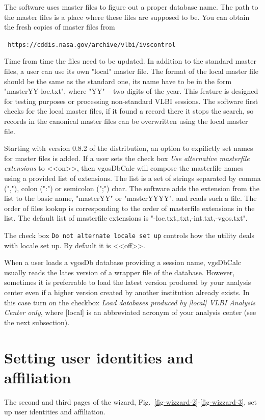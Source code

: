\documentclass [10pt,letterpaper]{report}
\begin{document}
The software uses master files to figure out a proper database name.
The path to the master files is a place where these files are
supposed to be. You can obtain the fresh copies of master files from
\begin{center}
{\tt
https://cddis.nasa.gov/archive/vlbi/ivscontrol
}
\end{center}
\noindent
Time from time the files need to be updated. In addition to the standard master
files, a user can use its own "local" master file. The format of the local master
file should be the same as the standard one, its name have to be in the form
"masterYY-loc.txt", where "YY" -- two digits of the year. This feature is designed
for testing purposes or processing non-standard VLBI sessions. The software first
checks for the local master files, if it found a record there it stops the search,
so records in the canonical master files can be overwritten using the local
master file.

Starting with version 0.8.2 of the distribution, an option to expilictly set names
for master files is added. If a user sets the check box {\sl Use alternative
masterfile extensions} to <<on>>, then vgosDbCalc will compose the masterfile names
using a provided list of extensions. The list is a set of strings separated by
comma (","), colon (":") or semicolon (";") char. The software adds the extension
from the list to the basic name, "masterYY" or "masterYYYY", and reads such a file.
The order of files lookup is corresponding to the order of masterfile
extensions in the list. The default list of masterfile extensions is
"-loc.txt,.txt,-int.txt,-vgos.txt".

The check box {\tt Do not alternate locale set up} controls how the utility
deals with locale set up. By default it is <<off>>.

When a user loads a vgosDb database providing a session name, vgsDbCalc
usually reads the lates version of a wrapper file of the database.
However, sometimes it is preferrable to load the latest version produced
by your analysis center even if a higher version created by another
institution already exists. In this case turn on the checkbox
{\sl Load databases produced by [local] VLBI Analysis Center only}, where
[local] is an abbreviated acronym of your analysis center (see the next subsection).






\section{Setting user identities and affiliation}
The second and third pages of the wizard, Fig.~\ref{fig-wizzard-2}-\ref{fig-wizzard-3},
set up user identities and affiliation.
\end{document}
